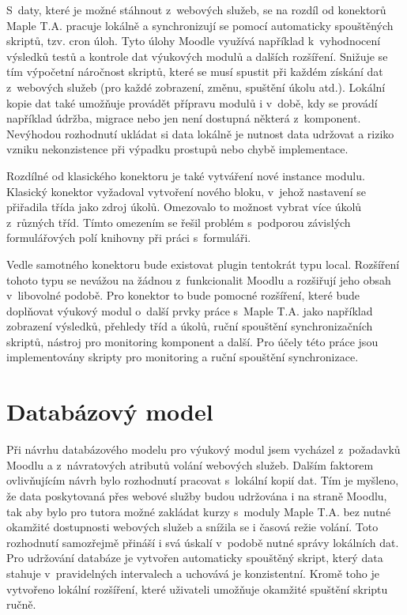 \documentclass[
print,
  11pt,
  table,   
  nolof,    
  nolot,
  oneside,final
]{fithesis3}
\begin{document}
S~daty, které je možné stáhnout z~webových služeb, se na rozdíl od konektorů Maple T.A. pracuje lokálně a synchronizují se pomocí automaticky spouštěných skriptů, tzv. cron úloh. Tyto úlohy Moodle využívá například k~vyhodnocení výsledků testů a kontrole dat výukových modulů a dalších rozšíření. Snižuje se tím výpočetní náročnost skriptů, které se musí spustit při každém získání dat z~webových služeb (pro každé zobrazení, změnu, spuštění úkolu atd.). Lokální kopie dat také umožňuje provádět přípravu modulů i v~době, kdy se provádí například údržba, migrace nebo jen není dostupná některá z~komponent. Nevýhodou rozhodnutí ukládat si data lokálně je nutnost data udržovat a riziko vzniku nekonzistence při výpadku prostupů nebo chybě implementace.

Rozdílné od klasického konektoru je také vytváření nové instance modulu. Klasický konektor vyžadoval vytvoření nového bloku, v~jehož nastavení se přiřadila třída jako zdroj úkolů. Omezovalo to možnost vybrat více úkolů z~různých tříd. Tímto omezením se řešil problém s~podporou závislých formulářových polí knihovny při práci s~formuláři. 

Vedle samotného konektoru bude existovat plugin tentokrát typu local. Rozšíření tohoto typu se nevážou na žádnou z~funkcionalit Moodlu a rozšiřují jeho obsah v~libovolné podobě. Pro konektor to bude pomocné rozšíření, které bude doplňovat výukový modul o~další prvky práce s~Maple T.A. jako například zobrazení výsledků, přehledy tříd a úkolů, ruční spouštění synchronizačních skriptů, nástroj pro monitoring komponent a další. Pro účely této práce jsou implementovány skripty pro monitoring a ruční spouštění synchronizace.

	\section{Databázový model}

Při návrhu databázového modelu pro výukový modul jsem vycházel z~požadavků Moodlu a z~návratových atributů volání webových služeb. Dalším faktorem ovlivňujícím návrh bylo rozhodnutí pracovat s~lokální kopií dat. Tím je myšleno, že data poskytovaná přes webové služby budou udržována i na straně Moodlu, tak aby bylo pro tutora možné zakládat kurzy s~moduly Maple T.A. bez nutné okamžité dostupnosti webových služeb a snížila se i časová režie volání. Toto rozhodnutí samozřejmě přináší i svá úskalí v~podobě nutné správy lokálních dat. Pro udržování databáze je vytvořen automaticky spouštěný skript, který data stahuje v~pravidelných intervalech a uchovává je konzistentní. Kromě toho je vytvořeno lokální rozšíření, které uživateli umožňuje okamžité spuštění skriptu ručně.
\end{document}
